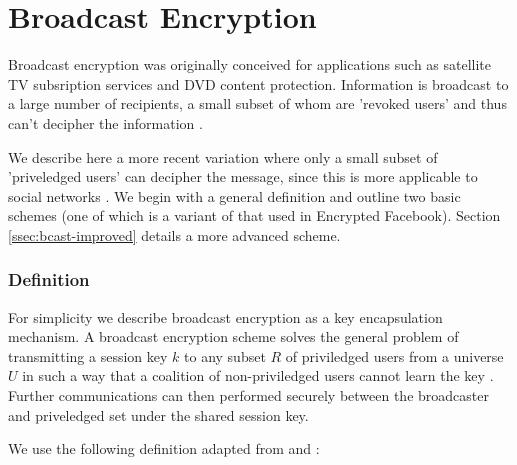 \chapter{Broadcast Encryption}


Broadcast encryption was originally conceived for applications such as satellite TV subsription services and DVD content protection. Information is broadcast to a large number of recipients, a small subset of whom are 'revoked users' and thus can't decipher the information \cite{fiat-naylors}.

We describe here a more recent variation where only a small subset of 'priveledged users' can decipher the message, since this is more applicable to social networks \cite{XXX}. We begin with a general definition and outline two basic schemes (one of which is a variant of that used in Encrypted Facebook). Section \ref{ssec:bcast-improved} details a more advanced scheme.


\subsection{Definition}

For simplicity we describe broadcast encryption as a key encapsulation mechanism. A broadcast encryption scheme solves the general problem of transmitting a session key $k$ to any subset $R$ of priviledged users from a universe $U$ in such a way that a coalition of non-priviledged users cannot learn the key \cite{fiat-naor}. Further communications can then performed securely between the broadcaster and priveledged set under the shared session key.

We use the following definition adapted from \cite{fiat-naor} and \cite{boneh}:

